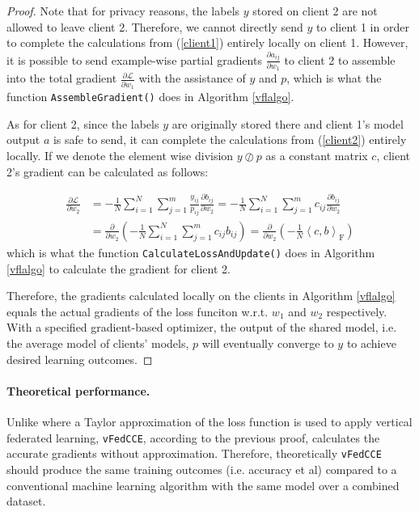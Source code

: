\documentclass{article}
\begin{document}
\begin{proof}
Note that for privacy reasons, the labels $y$ stored on client 2 are not allowed to leave client 2. Therefore, we cannot directly send $y$ to client 1 in order to complete the calculations from (\ref{client1}) entirely locally on client 1. However, it is possible to send example-wise partial gradients $\frac{\partial a_{ij}}{\partial w_1}$ to client 2 to assemble into the total gradient $\frac{\partial\mathcal{L}}{\partial w_1}$ with the assistance of $y$ and $p$, which is what the function \texttt{AssembleGradient()} does in Algorithm \ref{vflalgo}.

As for client 2, since the labels $y$ are originally stored there and client 1's model output $a$ is safe to send, it can complete the calculations from (\ref{client2}) entirely locally. If we denote the element wise division $y\oslash p$ as a constant matrix $c$, client 2's gradient can be calculated as follows:

\begin{align*}
  \frac{\partial\mathcal{L}}{\partial w_2}&=-\frac{1}{N}\sum_{i=1}^N \sum_{j=1}^m\frac{y_{ij}}{p_{ij}}\frac{\partial b_{ij}}{\partial w_2}=-\frac{1}{N}\sum_{i=1}^N \sum_{j=1}^m c_{ij}\frac{\partial b_{ij}}{\partial w_2}\\
  &=\frac{\partial}{\partial w_2}\left(-\frac{1}{N}\sum_{i=1}^N\sum_{j=1}^m c_{ij} b_{ij}\right)
  =\frac{\partial}{\partial w_2}\left(-\frac{1}{N}\left\langle c,b\right\rangle_\mathrm{F}\right)
\end{align*} which is what the function \texttt{CalculateLossAndUpdate()} does in Algorithm \ref{vflalgo} to calculate the gradient for client 2.

Therefore, the gradients calculated locally on the clients in Algorithm \ref{vflalgo} equals the actual gradients of the loss funciton w.r.t. $w_1$ and $w_2$ respectively. With a specified gradient-based optimizer, the output of the shared model, i.e. the average model of clients' models, $p$ will eventually converge to $y$ to achieve desired learning outcomes.
\end{proof}

\paragraph{Theoretical performance.} Unlike \cite{hardy2017private} where a Taylor approximation of the loss function is used to apply vertical federated learning, \texttt{vFedCCE}, according to the previous proof, calculates the accurate gradients without approximation. Therefore, theoretically \texttt{vFedCCE} should produce the same training outcomes (i.e. accuracy et al) compared to a conventional machine learning algorithm with the same model over a combined dataset.
\end{document}

